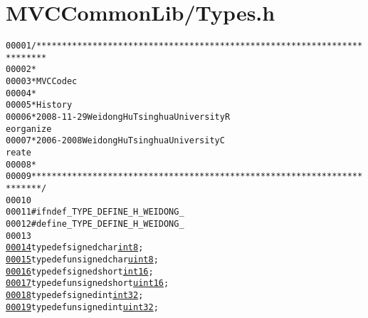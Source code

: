 \hypertarget{_types_8h_source}{
\section{MVCCommonLib/Types.h}
}


\begin{footnotesize}\begin{alltt}
00001 \textcolor{comment}{/************************************************************************}
00002 \textcolor{comment}{ *}
00003 \textcolor{comment}{ * MVC Codec}
00004 \textcolor{comment}{ * }
00005 \textcolor{comment}{ * History}
00006 \textcolor{comment}{ * 2008-11-29           Weidong Hu              Tsinghua University             R
      eorganize}
00007 \textcolor{comment}{ * 2006-2008            Weidong Hu              Tsinghua University             C
      reate}
00008 \textcolor{comment}{ * }
00009 \textcolor{comment}{ ************************************************************************/}
00010 
00011 \textcolor{preprocessor}{#ifndef \_TYPE\_DEFINE\_H\_WEIDONG\_}
00012 \textcolor{preprocessor}{}\textcolor{preprocessor}{#define \_TYPE\_DEFINE\_H\_WEIDONG\_}
00013 \textcolor{preprocessor}{}
\hypertarget{_types_8h_source_l00014}{}\hyperlink{_types_8h_a1b956fe1df85f3c132b21edb4e116458}{00014} \textcolor{keyword}{typedef} \textcolor{keywordtype}{signed} \textcolor{keywordtype}{char} \hyperlink{_types_8h_a1b956fe1df85f3c132b21edb4e116458}{int8};
\hypertarget{_types_8h_source_l00015}{}\hyperlink{_types_8h_adde6aaee8457bee49c2a92621fe22b79}{00015} \textcolor{keyword}{typedef} \textcolor{keywordtype}{unsigned} \textcolor{keywordtype}{char} \hyperlink{_types_8h_adde6aaee8457bee49c2a92621fe22b79}{uint8};
\hypertarget{_types_8h_source_l00016}{}\hyperlink{_types_8h_a259fa4834387bd68627ddf37bb3ebdb9}{00016} \textcolor{keyword}{typedef} \textcolor{keywordtype}{signed} \textcolor{keywordtype}{short} \hyperlink{_types_8h_a259fa4834387bd68627ddf37bb3ebdb9}{int16};
\hypertarget{_types_8h_source_l00017}{}\hyperlink{_types_8h_a05f6b0ae8f6a6e135b0e290c25fe0e4e}{00017} \textcolor{keyword}{typedef} \textcolor{keywordtype}{unsigned} \textcolor{keywordtype}{short} \hyperlink{_types_8h_a05f6b0ae8f6a6e135b0e290c25fe0e4e}{uint16};
\hypertarget{_types_8h_source_l00018}{}\hyperlink{_types_8h_a43d43196463bde49cb067f5c20ab8481}{00018} \textcolor{keyword}{typedef} \textcolor{keywordtype}{signed} \textcolor{keywordtype}{int} \hyperlink{_types_8h_a43d43196463bde49cb067f5c20ab8481}{int32};
\hypertarget{_types_8h_source_l00019}{}\hyperlink{_types_8h_a1134b580f8da4de94ca6b1de4d37975e}{00019} \textcolor{keyword}{typedef} \textcolor{keywordtype}{unsigned} \textcolor{keywordtype}{int} \hyperlink{_types_8h_a1134b580f8da4de94ca6b1de4d37975e}{uint32};

\end{alltt}
\end{footnotesize}
